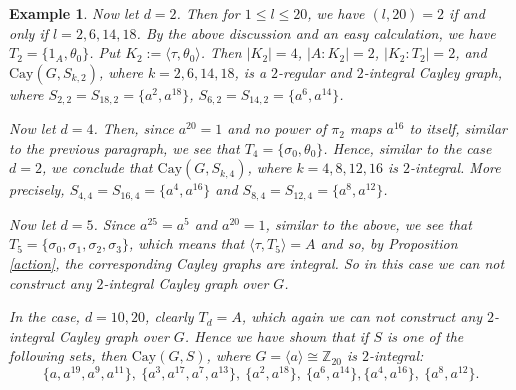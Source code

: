 \documentclass[12pt,a4paper]{article}
\newtheorem{example}{Example}[section]%
\def \leq {\leqslant}
\begin{document}
\begin{example}
			Now let $d=2$. Then for $1\leq l\leq 20$, we have $(l,20)=2$ if and only if $l=2,6,14,18$. 
			By the above discussion and an easy calculation, we have $T_2=\{1_A,\theta_0\}$. 
			Put $K_2:=\langle\tau,\theta_0\rangle$. Then $|K_2|=4$, $|A:K_2|=2$, $|K_2:T_2|=2$, and
			$\mathrm{Cay}(G,S_{k,2})$, where $k=2,6,14,18$, is a $2$-regular and $2$-integral Cayley graph, where $S_{2,2}=S_{18,2}=\{a^2,a^{18}\}$, $S_{6,2}=S_{14,2}=\{a^6,a^{14}\}$.
			
			Now let $d=4$. Then, since $a^{20}=1$ and no power of $\pi_2$ maps $a^{16}$ to itself, similar to the previous paragraph, we see that $T_4=\{\sigma_0,\theta_0\}$. Hence, similar to the case $d=2$, we conclude that $\mathrm{Cay}(G,S_{k,4})$, where $k=4,8,12,16$ is $2$-integral. More precisely, $S_{4,4}=S_{16,4}=\{a^4,a^{16}\}$ and $S_{8,4}=S_{12,4}=\{a^8,a^{12}\}$.
			
			Now let $d=5$. Since $a^{25}=a^5$ and $a^{20}=1$, similar to the above, we see that $T_5=\{\sigma_0,\sigma_1,\sigma_2,\sigma_3\}$, which means that $\langle\tau,T_5\rangle=A$ and so, by Proposition \ref{action}, the corresponding Cayley graphs are integral. So in this case we can not construct any $2$-integral Cayley graph over $G$.
			
			In the case, $d=10,20$, clearly $T_{d}=A$, which again we can not construct any $2$-integral Cayley graph over $G$. Hence we have shown that if $S$ is one of the following sets, then $\mathrm{Cay}(G,S)$, where $G=\langle a\rangle\cong\mathbb Z_{20}$ is $2$-integral:
			$$\{a,a^{19},a^9,a^{11}\},~\{a^3,a^{17},a^{7},a^{13}\},~\{a^2,a^{18}\},~\{a^6,a^{14}\}, \{a^4,a^{16}\},~\{a^8,a^{12}\}.$$
		\end{example}	
	
	
	
\end{document}
